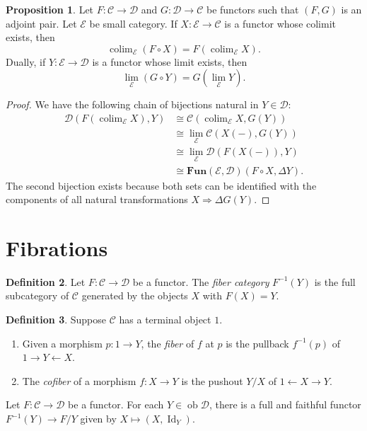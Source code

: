 \documentclass[10pt,letterpaper,cm]{nupset}
\theoremstyle{definition}
\newtheorem{definition}{Definition}[section]
\theoremstyle{theorem}
\newtheorem{prop}[definition]{Proposition}
\theoremstyle{remark}
\newcommand{\1}{\mathbf{1}}
\renewcommand{\c}{\mathscr{C}}
\renewcommand{\d}{\mathscr{D}}
\newcommand{\e}{\mathscr{E}}
\newcommand{\0}{\vec 0}
\DeclareMathOperator{\id}{Id}
\DeclareMathOperator{\ob}{ob}
\DeclareMathOperator{\colim}{colim}
\begin{document}
\begin{prop}
Let $F: \c \to \d$ and $G : \d \to \c$ be functors such that $\left(F, G\right)$ is an adjoint pair. Let $\e$ be small category. If $X: \e \to \c$ is a functor whose colimit exists, then $$\colim_{\e}(F \circ X) = F(\colim_{\e} X).$$
Dually, if $Y: \e \to \d$ is a functor whose limit exists, then $$ \lim_{\e}(G \circ Y)=  G(\lim_{\e} Y) .$$ 
\end{prop}
\begin{proof}
We have the following chain of bijections  natural in $Y \in \d$: 
\begin{align*}
 \d(F(\colim_{\e}{X}), Y) & \cong \c(\colim_{\e} X, G(Y)) 
 \\ & \cong \lim_{\e} \c(X(-), G(Y))
 \\ &  \cong \lim_{\e} \d(F(X(-)), Y)
 \\ &  \cong \mathbf{Fun}(\e, \d)(F \circ X, \Delta{Y}).
 \end{align*} The second bijection exists because both sets can be identified with the components of all natural transformations $X \Rightarrow \Delta{G}(Y)$.
\end{proof}

\section{Fibrations}

\begin{definition}
Let $F : \c \to \d$ be a functor. The \textit{fiber category} $F^{{-1}}(Y)$ is the full subcategory of $\c$ generated by the objects $X$ with $F(X) =Y$.
\end{definition}

\begin{definition}
Suppose $\c$ has a terminal object $1$. 
\begin{enumerate}
\item Given a morphism $p: 1 \to Y$, the \textit{fiber} of $f$ at $p$ is the pullback $f^{{-1}}(p)$ of $1 \rightarrow Y \leftarrow X$.
\item The \textit{cofiber} of a morphism $f: X \to Y$ is the pushout $Y/X$ of  $1 \leftarrow X \rightarrow Y$. 
\end{enumerate}
\end{definition}

\smallskip

Let $F : \c \to \d$ be a functor. For each $Y \in \ob \d$, there is a full and faithful functor $F^{{-1}}(Y)  \to F/Y$ given by $X \mapsto \left(X, \id_Y\right)$. 
\end{document}

